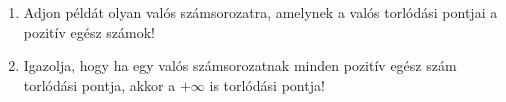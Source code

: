 \documentclass[11pt]{scrartcl}
\begin{document}
\begin{enumerate}
	\item Adjon példát olyan valós számsorozatra, amelynek a valós torlódási
	      pontjai a pozitív egész számok!

	\item Igazolja, hogy ha egy valós számsorozatnak minden pozitív egész szám
	      torlódási pontja, akkor a $+\infty$ is torlódási pontja!
\end{enumerate}
\end{document}
